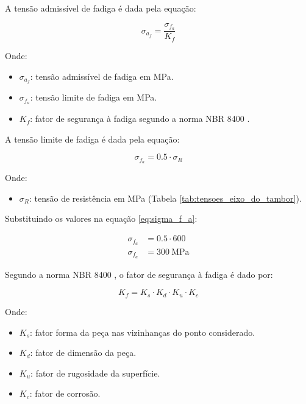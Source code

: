 A tensão admissível de fadiga é dada pela equação:

\begin{equation}
  \sigma_{a_f} = \frac{\sigma_{f_a}}{K_f}
  \label{eq:sigma_a_f}
\end{equation}

Onde:

\begin{itemize}
  \item $\sigma_{a_f}$: tensão admissível de fadiga em \si{\mega\pascal}.
  \item $\sigma_{f_a}$: tensão limite de fadiga em \si{\mega\pascal}.
  \item $K_f$: fator de segurança à fadiga segundo a norma NBR 8400 \cite{nbr8400}.
\end{itemize}

\vspace{1em}

A tensão limite de fadiga é dada pela equação:

\begin{equation}
  \sigma_{f_a} = \num{0.5} \cdot \sigma_R
  \label{eq:sigma_f_a}
\end{equation}

Onde:

\begin{itemize}
  \item $\sigma_R$: tensão de resistência em \si{\mega\pascal} (Tabela \ref{tab:tensoes_eixo_do_tambor}).
\end{itemize}

\vspace{1em}

Substituindo os valores na equação \eqref{eq:sigma_f_a}:

\begin{align*}
  \sigma_{f_a} & = \num{0.5} \cdot 600            \\
  \sigma_{f_a} & = \boxed{\SI{300}{\mega\pascal}}
\end{align*}

Segundo a norma NBR 8400 \cite{nbr8400}, o fator de segurança à fadiga é dado por:

\begin{equation}
  K_f = K_s \cdot K_d \cdot K_u \cdot K_c
  \label{eq:k_f}
\end{equation}

Onde:

\begin{itemize}
  \item $K_s$: fator forma da peça nas vizinhanças do ponto considerado.
  \item $K_d$: fator de dimensão da peça.
  \item $K_u$: fator de rugosidade da superfície.
  \item $K_c$: fator de corrosão.
\end{itemize}

